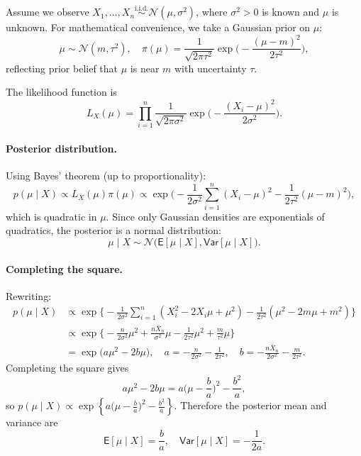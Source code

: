 \begin{ex}

Assume we observe \(X_1, \dots, X_n \stackrel{\text{i.i.d.}}{\sim} \mathcal{N}(\mu, \sigma^2)\), where \(\sigma^2>0\) is known and \(\mu\) is unknown. 
For mathematical convenience, we take a Gaussian prior on \(\mu\):
\[
\mu \sim \mathcal{N}(m, \tau^2), \quad 
\pi(\mu) = \frac{1}{\sqrt{2\pi \tau^2}} \exp\Bigg( -\frac{(\mu - m)^2}{2\tau^2} \Bigg),
\]
reflecting prior belief that \(\mu\) is near \(m\) with uncertainty \(\tau\).

The likelihood function is
\[
L_X(\mu) = \prod_{i=1}^{n} \frac{1}{\sqrt{2\pi \sigma^2}} \exp \Bigg( -\frac{(X_i - \mu)^2}{2\sigma^2} \Bigg ).
\]

\paragraph{Posterior distribution.} Using Bayes' theorem (up to proportionality):
\[
p(\mu \mid X) \propto L_X(\mu) \pi(\mu) \propto 
\exp\Bigg( -\frac{1}{2\sigma^2} \sum_{i=1}^{n} (X_i - \mu)^2 - \frac{1}{2\tau^2} (\mu - m)^2 \Bigg),
\]
which is quadratic in \(\mu\). Since only Gaussian densities are exponentials of quadratics, the posterior is a normal distribution:
\[
\mu \mid X \sim \mathcal{N}\Big( \mathsf{E}[\mu \mid X], \mathsf{Var}[\mu \mid X] \Big).
\]

\paragraph{Completing the square.} Rewriting:
\begin{align*}
p(\mu \mid X) &\propto \exp \Bigg\{ -\frac{1}{2\sigma^2} \sum_{i=1}^{n} (X_i^2 - 2 X_i \mu + \mu^2) - \frac{1}{2\tau^2} (\mu^2 - 2 m \mu + m^2) \Bigg\} \\
&\propto \exp \Bigg\{ -\frac{n}{2\sigma^2} \mu^2 + \frac{n \bar{X}_n}{\sigma^2}\mu - \frac{1}{2\tau^2} \mu^2 + \frac{m}{\tau^2} \mu \Bigg\} \\
&= \exp\Big( a \mu^2 - 2 b \mu \Big), 
\quad 
a = -\frac{n}{2\sigma^2} - \frac{1}{2\tau^2}, \quad 
b = -\frac{n \bar{X}_n}{2\sigma^2} - \frac{m}{2\tau^2}.
\end{align*}
Completing the square gives
\[
a \mu^2 - 2b \mu = a \Big(\mu - \frac{b}{a}\Big)^2 - \frac{b^2}{a},
\]
so \(p(\mu \mid X) \propto \exp\left\{ a \Big(\mu - \frac{b}{a}\Big)^2 - \frac{b^2}{a} \right\}\). Therefore the posterior mean and variance are
\[
\mathsf{E}[\mu \mid X] = \frac{b}{a}, \quad 
\mathsf{Var}[\mu \mid X] = -\frac{1}{2a}.
\]


\end{ex}
